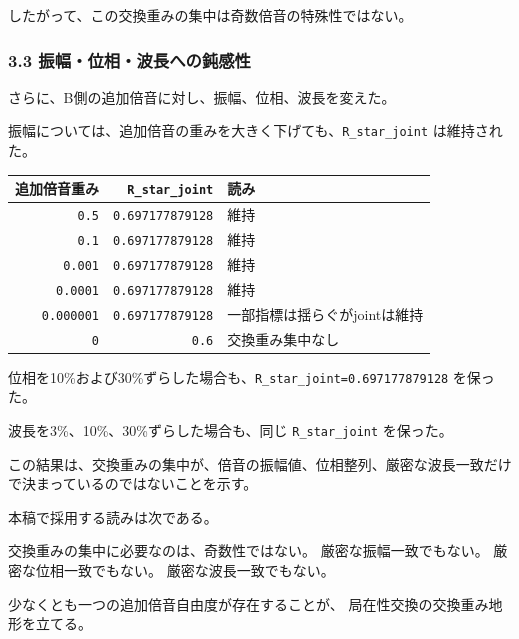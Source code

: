 \documentclass[
]{article}
\newenvironment{Shaded}{}{}
\newcommand{\NormalTok}[1]{#1}
\newcounter{none} %
\begin{document}
したがって、この交換重みの集中は奇数倍音の特殊性ではない。

\subsubsection{3.3
振幅・位相・波長への鈍感性}\label{ux632fux5e45ux4f4dux76f8ux6ce2ux9577ux3078ux306eux920dux611fux6027}

さらに、B側の追加倍音に対し、振幅、位相、波長を変えた。

振幅については、追加倍音の重みを大きく下げても、\texttt{R\_star\_joint}
は維持された。

{\def\LTcaptype{none} %
\begin{longtable}[]{@{}rrl@{}}
\toprule\noalign{}
追加倍音重み & \texttt{R\_star\_joint} & 読み \\
\midrule\noalign{}
\endhead
\bottomrule\noalign{}
\endlastfoot
\texttt{0.5} & \texttt{0.697177879128} & 維持 \\
\texttt{0.1} & \texttt{0.697177879128} & 維持 \\
\texttt{0.001} & \texttt{0.697177879128} & 維持 \\
\texttt{0.0001} & \texttt{0.697177879128} & 維持 \\
\texttt{0.000001} & \texttt{0.697177879128} &
一部指標は揺らぐがjointは維持 \\
\texttt{0} & \texttt{0.6} & 交換重み集中なし \\
\end{longtable}
}

位相を10\%および30\%ずらした場合も、\texttt{R\_star\_joint=0.697177879128}
を保った。

波長を3\%、10\%、30\%ずらした場合も、同じ \texttt{R\_star\_joint}
を保った。

この結果は、交換重みの集中が、倍音の振幅値、位相整列、厳密な波長一致だけで決まっているのではないことを示す。

本稿で採用する読みは次である。

\begin{Shaded}
\begin{Highlighting}[]
\NormalTok{交換重みの集中に必要なのは、奇数性ではない。}
\NormalTok{厳密な振幅一致でもない。}
\NormalTok{厳密な位相一致でもない。}
\NormalTok{厳密な波長一致でもない。}

\NormalTok{少なくとも一つの追加倍音自由度が存在することが、}
\NormalTok{局在性交換の交換重み地形を立てる。}
\end{Highlighting}
\end{Shaded}
\end{document}
